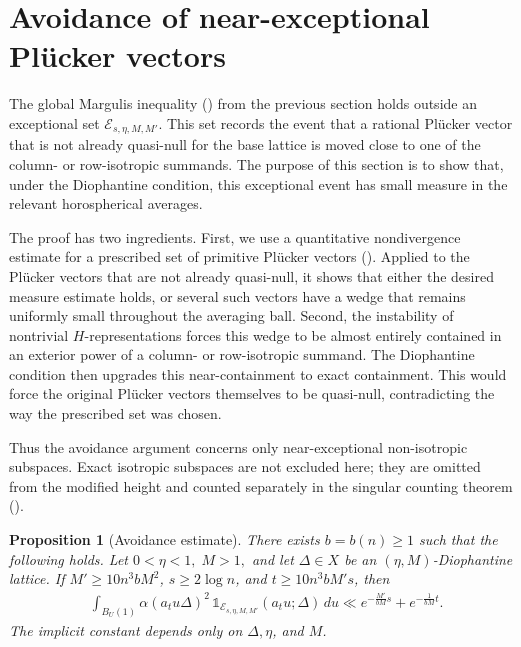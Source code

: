 \documentclass[reqno,11pt]{amsart}
\numberwithin{equation}{section}
\newtheorem{proposition}[theorem]{Proposition}
\theoremstyle{definition}
\theoremstyle{remark}
\begin{document}
\section{Avoidance of near-exceptional Pl\"ucker vectors}
\label{s:avoidance}

The global Margulis inequality () from the previous section holds outside an
exceptional set $\mathcal E_{s,\eta,M,M'}$. This set records the event that a rational
Pl\"ucker vector that is not already quasi-null for the base lattice is moved close to one of the column- or row-isotropic summands. The purpose of this section is to show that, under the Diophantine condition, this exceptional event has small measure in the relevant horospherical
averages.

The proof has two ingredients. First, we use a quantitative nondivergence estimate for a
prescribed set of primitive Pl\"ucker vectors (). Applied to the Pl\"ucker
vectors that are not already quasi-null, it shows that either the desired
measure estimate holds, or several such vectors have a wedge that
remains uniformly small throughout the averaging ball. Second, the
instability of nontrivial $H$-representations forces this wedge to be
almost entirely contained in an exterior power of a column- or row-isotropic summand.
The Diophantine condition then upgrades this near-containment to exact
containment. This would force the original Pl\"ucker
vectors themselves to be quasi-null, contradicting the way the prescribed
set was chosen.

Thus the avoidance argument concerns only near-exceptional non-isotropic subspaces.
Exact isotropic subspaces are not excluded here; they are omitted from the
modified height and counted separately in the singular counting theorem ().
\medskip


\begin{proposition}[Avoidance estimate]\label{prop:avoidance'}
There exists $b=b(n)\ge1$ such that the following holds. Let
$
0<\eta<1,\;  M>1,
$
and let $\Delta\in X$ be an $(\eta,M)$-Diophantine lattice. If
$
M'\ge 10n^3bM^2$, $s\ge 2\log n$, and
$t\ge 10n^3bM's$,
then
\begin{equation}\label{eq:avoidance}
\begin{aligned}
&\int_{B_{U}(1)}
\alpha(a_tu\Delta)^{2}\, 
\mathds{1}_{\mathcal E_{s,\eta,M,M'}}(a_tu;\Delta)\,du \ll
e^{-\frac{M'}{bM}s}
+ e^{-\frac{1}{bM}t}.
\end{aligned}
\end{equation}
The implicit constant depends only on
$\Delta,\eta$, and $M$.
\end{proposition}
\end{document}
